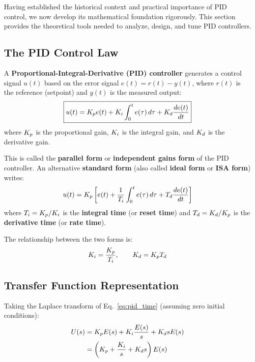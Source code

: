 Having established the historical context and practical importance of PID control, we now develop its mathematical foundation rigorously. This section provides the theoretical tools needed to analyze, design, and tune PID controllers.

\subsection{The PID Control Law}

\begin{definition}
A \textbf{Proportional-Integral-Derivative (PID) controller} generates a control signal $u(t)$ based on the error signal $e(t) = r(t) - y(t)$, where $r(t)$ is the reference (setpoint) and $y(t)$ is the measured output:
\begin{equation}
\boxed{u(t) = K_p e(t) + K_i \int_0^t e(\tau) \, d\tau + K_d \frac{de(t)}{dt}}
\label{eq:pid_time}
\end{equation}
where $K_p$ is the proportional gain, $K_i$ is the integral gain, and $K_d$ is the derivative gain.
\end{definition}

This is called the \textbf{parallel form} or \textbf{independent gains form} of the PID controller. An alternative \textbf{standard form} (also called \textbf{ideal form} or \textbf{ISA form}) writes:
\begin{equation}
u(t) = K_p \left[ e(t) + \frac{1}{T_i} \int_0^t e(\tau) \, d\tau + T_d \frac{de(t)}{dt} \right]
\label{eq:pid_standard}
\end{equation}
where $T_i = K_p/K_i$ is the \textbf{integral time} (or \textbf{reset time}) and $T_d = K_d/K_p$ is the \textbf{derivative time} (or \textbf{rate time}).

The relationship between the two forms is:
\begin{equation}
K_i = \frac{K_p}{T_i}, \qquad K_d = K_p T_d
\end{equation}

\subsection{Transfer Function Representation}

Taking the Laplace transform of Eq.~\eqref{eq:pid_time} (assuming zero initial conditions):
\begin{align}
U(s) &= K_p E(s) + K_i \frac{E(s)}{s} + K_d s E(s) \\
&= \left( K_p + \frac{K_i}{s} + K_d s \right) E(s)
\end{align}

